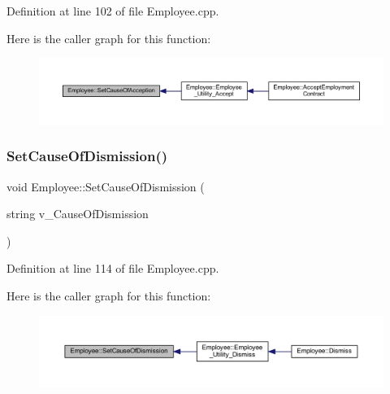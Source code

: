 Definition at line 102 of file Employee.\+cpp.

Here is the caller graph for this function\+:
\nopagebreak
\begin{figure}[H]
\begin{center}
\leavevmode
\includegraphics[width=350pt]{class_employee_a7eebc60f8cfd43fe07fae6196a317b0c_icgraph}
\end{center}
\end{figure}
\mbox{\label{class_employee_ac129a41d2cb756360ad056bf39c25464}} 
\subsubsection{\texorpdfstring{Set\+Cause\+Of\+Dismission()}{SetCauseOfDismission()}}
{\footnotesize\ttfamily void Employee\+::\+Set\+Cause\+Of\+Dismission (\begin{DoxyParamCaption}\item[{string}]{v\+\_\+\+Cause\+Of\+Dismission }\end{DoxyParamCaption})}



Definition at line 114 of file Employee.\+cpp.

Here is the caller graph for this function\+:
\nopagebreak
\begin{figure}[H]
\begin{center}
\leavevmode
\includegraphics[width=350pt]{class_employee_ac129a41d2cb756360ad056bf39c25464_icgraph}
\end{center}
\end{figure}
\mbox{\label{class_employee_a62cc0f19d969528e061ad178a1b109ac}} 
